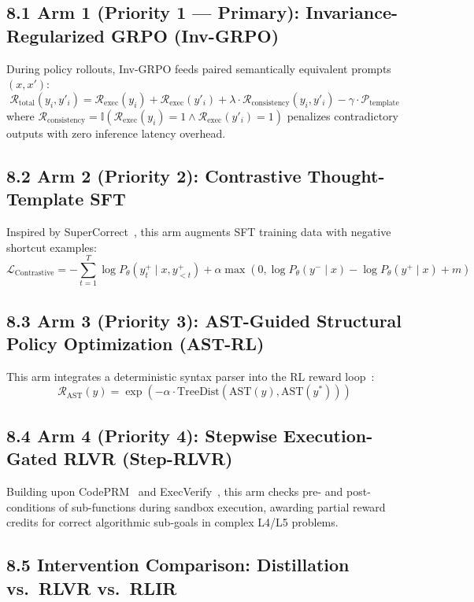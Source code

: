 \documentclass[12pt, a4paper]{article}
\begin{document}
\subsection{8.1 Arm 1 (Priority 1 --- Primary): Invariance-Regularized GRPO (Inv-GRPO)}

During policy rollouts, Inv-GRPO feeds paired semantically equivalent prompts $(x, x')$:
\[
\mathcal{R}_{\text{total}}(y_i, y'_i) = \mathcal{R}_{\text{exec}}(y_i) + \mathcal{R}_{\text{exec}}(y'_i) + \lambda \cdot \mathcal{R}_{\text{consistency}}(y_i, y'_i) - \gamma \cdot \mathcal{P}_{\text{template}}
\]
where $\mathcal{R}_{\text{consistency}} = \mathbb{I}(\mathcal{R}_{\text{exec}}(y_i) = 1 \land \mathcal{R}_{\text{exec}}(y'_i) = 1)$ penalizes contradictory outputs with zero inference latency overhead.

\subsection{8.2 Arm 2 (Priority 2): Contrastive Thought-Template SFT}

Inspired by SuperCorrect~\cite{supercorrect}, this arm augments SFT training data with negative shortcut examples:
\[
\mathcal{L}_{\text{Contrastive}} = -\sum_{t=1}^{T} \log P_\theta(y_t^+ \mid x, y_{<t}^+) + \alpha \max \left( 0, \log P_\theta(y^- \mid x) - \log P_\theta(y^+ \mid x) + m \right)
\]

\subsection{8.3 Arm 3 (Priority 3): AST-Guided Structural Policy Optimization (AST-RL)}

This arm integrates a deterministic syntax parser into the RL reward loop~\cite{treediff, veriseek}:
\[
\mathcal{R}_{\text{AST}}(y) = \exp \left( - \alpha \cdot \text{TreeDist}(\text{AST}(y), \text{AST}(y^*)) \right)
\]

\subsection{8.4 Arm 4 (Priority 4): Stepwise Execution-Gated RLVR (Step-RLVR)}

Building upon CodePRM~\cite{codeprm} and ExecVerify~\cite{execverify}, this arm checks pre- and post-conditions of sub-functions during sandbox execution, awarding partial reward credits for correct algorithmic sub-goals in complex L4/L5 problems.

\subsection{8.5 Intervention Comparison: Distillation vs.\ RLVR vs.\ RLIR}
\end{document}
